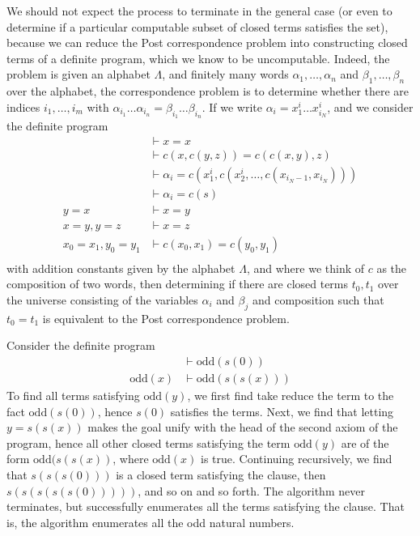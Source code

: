 \begin{example}
We should not expect the process to terminate in the general case (or even to determine if a particular computable subset of closed terms satisfies the set), because we can reduce the Post correspondence problem into constructing closed terms of a definite program, which we know to be uncomputable. Indeed, the problem is given an alphabet $\Lambda$, and finitely many words $\alpha_1, \dots, \alpha_n$ and $\beta_1, \dots, \beta_n$ over the alphabet, the correspondence problem is to determine whether there are indices $i_1, \dots, i_m$ with $\alpha_{i_1} \dots \alpha_{i_n} = \beta_{i_1} \dots \beta_{i_n}$. If we write $\alpha_i = x_1^i \dots x_{i_N}^i$, and we consider the definite program
%
\begin{align*}
    &\vdash x = x\\
    &\vdash c(x,c(y,z)) = c(c(x,y),z)\\
    &\vdash \alpha_i = c(x_1^i, c(x_2^i, \dots, c(x_{i_N-1}, x_{i_N})))\\
    &\vdash \alpha_i = c(s)\\
    y = x &\vdash x = y\\
    x = y, y = z &\vdash x = z\\
    x_0 = x_1, y_0 = y_1 &\vdash c(x_0,x_1) = c(y_0,y_1)\\
\end{align*}
%
with addition constants given by the alphabet $\Lambda$, and where we think of $c$ as the composition of two words, then determining if there are closed terms $t_0,t_1$ over the universe consisting of the variables $\alpha_i$ and $\beta_j$ and composition such that $t_0 = t_1$ is equivalent to the Post correspondence problem.
\end{example}

\begin{example}
    Consider the definite program
    \begin{align*}
        &\vdash \text{odd}(s(0))\\
        \text{odd}(x) &\vdash \text{odd}(s(s(x)))
    \end{align*}
    To find all terms satisfying $\text{odd}(y)$, we first find take reduce the term to the fact $\text{odd}(s(0))$, hence $s(0)$ satisfies the terms. Next, we find that letting $y = s(s(x))$ makes the goal unify with the head of the second axiom of the program, hence all other closed terms satisfying the term $\text{odd}(y)$ are of the form $\text{odd}(s(s(x))$, where $\text{odd}(x)$ is true. Continuing recursively, we find that $s(s(s(0)))$ is a closed term satisfying the clause, then $s(s(s(s(s(0)))))$, and so on and so forth. The algorithm never terminates, but successfully enumerates all the terms satisfying the clause. That is, the algorithm enumerates all the odd natural numbers.
\end{example}

